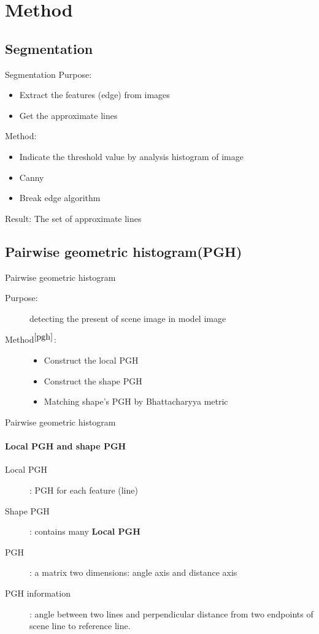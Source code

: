 \documentclass{beamer}
\begin{document}
\section{Method}
\subsection{Segmentation}
\begin{frame}{Segmentation}
	Purpose: 
	\begin{itemize}
		\item Extract the features (edge) from images
		\item Get the approximate lines
	\end{itemize}
	Method:
	\begin{itemize}
		\item Indicate the threshold value by analysis histogram of image		
		\item Canny
		\item Break edge algorithm
	\end{itemize}
	Result: The set of approximate lines
\end{frame}
\subsection{Pairwise geometric histogram(PGH)}
\begin{frame}{Pairwise geometric histogram}
	\begin{description}
		\item[Purpose:] detecting the present of scene image in model image
		\item[Method$^{\cite{pgh}}$:]
		\begin{itemize}
			\item Construct the local PGH
			\item Construct the shape PGH
			\item Matching shape's PGH by Bhattacharyya metric
		\end{itemize}
	\end{description}
\end{frame}
\begin{frame}{Pairwise geometric histogram}
	\framesubtitle{Local PGH and shape PGH}
	\begin{description}
		\item[Local PGH]: PGH for each feature (line)
		\item[Shape PGH]: contains many \textbf{Local PGH}
		\item[PGH]: a matrix two dimensions: angle axis and distance axis
		\item[PGH information]: angle between two lines and perpendicular distance from two endpoints of scene line to reference line.
	\end{description}
\end{frame}
\end{document}
